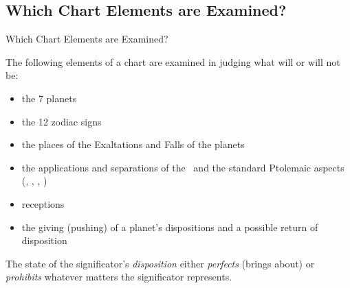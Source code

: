 \subsection{Which Chart Elements are Examined?}
\begin{frame}[t]{Which Chart Elements are Examined?}

The following elements of a chart are examined in judging what will or will not be:
\begin{itemize}
\item the 7 planets
\item the 12 zodiac signs
\item the places of  the Exaltations and Falls of the planets
\item the applications and separations of the \Conjunction\ and the standard Ptolemaic aspects (\Sextile, \Square, \Trine, \Opposition)
\item receptions
\item the giving (pushing) of a planet's dispositions and a possible return of disposition
\end{itemize}
\vspace{0.5cm}

The state of the significator's \textsl{disposition} either \textsl{perfects} (brings about) or \textsl{prohibits} whatever matters the significator represents.
\end{frame}
